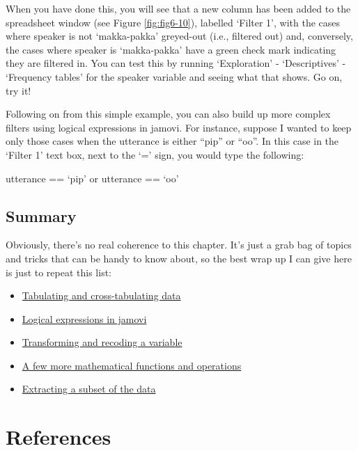 \documentclass[
]{book}
\providecommand{\tightlist}{%
  \setlength{\itemsep}{0pt}\setlength{\parskip}{0pt}}
\newlength{\cslhangindent}
\newlength{\cslentryspacingunit} %
\newenvironment{CSLReferences}[2] %
 {%
  \setlength{\parindent}{0pt}
  \ifodd #1
  \let\oldpar\par
  \def\par{\hangindent=\cslhangindent\oldpar}
  \fi
  \setlength{\parskip}{#2\cslentryspacingunit}
 }%
 {}
\begin{document}
When you have done this, you will see that a new column has been added to the spreadsheet window (see Figure \ref{fig:fig6-10}), labelled `Filter 1', with the cases where speaker is not `makka-pakka' greyed-out (i.e., filtered out) and, conversely, the cases where speaker is `makka-pakka' have a green check mark indicating they are filtered in. You can test this by running `Exploration' - `Descriptives' - `Frequency tables' for the speaker variable and seeing what that shows. Go on, try it!

Following on from this simple example, you can also build up more complex filters using logical expressions in jamovi. For instance, suppose I wanted to keep only those cases when the utterance is either ``pip'' or ``oo''. In this case in the `Filter 1' text box, next to the `=' sign, you would type the following:

utterance == `pip' or utterance == `oo'

\hypertarget{summary}{%
\section{Summary}\label{summary}}

Obviously, there's no real coherence to this chapter. It's just a grab bag of topics and tricks that can be handy to know about, so the best wrap up I can give here is just to repeat this list:

\begin{itemize}
\tightlist
\item
  \protect\hyperlink{tabulating-and-cross-tabulating-data}{Tabulating and cross-tabulating data}
\item
  \protect\hyperlink{logical-expressions-in-jamovi}{Logical expressions in jamovi}
\item
  \protect\hyperlink{transforming-and-recoding-a-variable}{Transforming and recoding a variable}
\item
  \protect\hyperlink{a-few-more-mathematical-functions-and-operations}{A few more mathematical functions and operations}
\item
  \protect\hyperlink{extracting-a-subset-of-the-data}{Extracting a subset of the data}
\end{itemize}

\hypertarget{references}{%
\chapter*{References}\label{references}}

\hypertarget{refs}{}
\begin{CSLReferences}{0}{0}
\end{CSLReferences}
\end{document}
